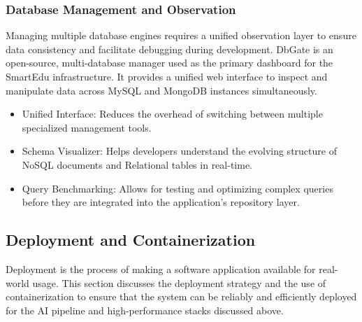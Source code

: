 \subsubsection*{Database Management and Observation}
Managing multiple database engines requires a unified observation layer to ensure data consistency and facilitate debugging during development.
DbGate is an open-source, multi-database manager used as the primary dashboard for the SmartEdu infrastructure. It provides a unified web interface to inspect and manipulate data across MySQL and MongoDB instances simultaneously.
\begin{itemize}
    \item {Unified Interface:} Reduces the overhead of switching between multiple specialized management tools.
    \item {Schema Visualizer:} Helps developers understand the evolving structure of NoSQL documents and Relational tables in real-time.
    \item {Query Benchmarking:} Allows for testing and optimizing complex queries before they are integrated into the application's repository layer.
\end{itemize}

\subsection{Deployment and Containerization}
Deployment is the process of making a software application available for real-world usage. This section discusses the deployment strategy and the use of containerization to ensure that the system can be reliably and efficiently deployed for the AI pipeline and high-performance stacks discussed above.

